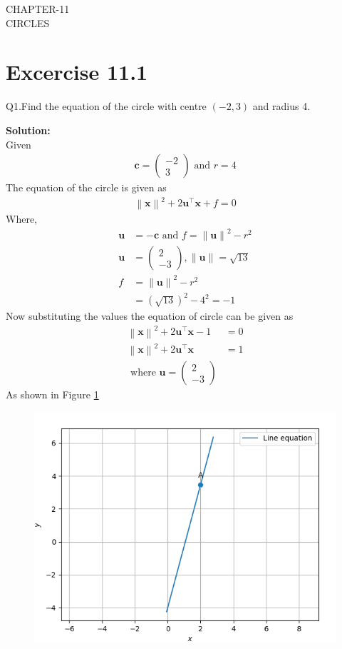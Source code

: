 \documentclass[12pt]{article}
\providecommand{\norm}[1]{\left\lVert#1\right\rVert}
\newcommand{\solution}{\noindent \textbf{Solution: }}
\newcommand{\myvec}[1]{\ensuremath{\begin{pmatrix}#1\end{pmatrix}}}
\let\vec\mathbf
\begin{document}
\begin{center}
\textbf\large{CHAPTER-11 \\ CIRCLES}

\end{center}
\section*{Excercise 11.1}

Q1.Find the equation of the circle with centre $(-2,3)$ and radius 4.

\solution
\\
Given
\begin{align}
	\vec{c} = \myvec{-2\\3} \text{ and } r = 4
\end{align}
The equation of the circle is given as
\begin{align}
	\norm{\vec{x}}^{2} + 2\vec{u}^{\top}\vec{x} + f = 0
\end{align}
Where,
\begin{align}
	\vec{u} &= -\vec{c} \text{ and } f = \norm{\vec{u}}^{2} - r^{2}\\
	\vec{u} &= \myvec{2\\-3},\norm{\vec{u}} = \sqrt{13}\\
	f &= \norm{\vec{u}}^2 - r^2\\
	&= (\sqrt{13})^2 - 4^2= -1
\end{align}
Now substituting the values the equation of circle can be given as
\begin{align}
	\norm{\vec{x}}^2 + 2\vec{u}^\top\vec{x}-1 &= 0\\
	\norm{\vec{x}}^2 + 2\vec{u}^\top\vec{x} &= 1\\
	\text{ where } \vec{u} = \myvec{2\\-3}        		       
\end{align}
As shown in Figure \ref{fig:Fig1}	
\begin{figure}[!h]
	\begin{center} 
	    \includegraphics[width=\columnwidth]{figs/line.png}
	\end{center}
\caption{}
\label{fig:Fig1}
\end{figure}
\end{document}
